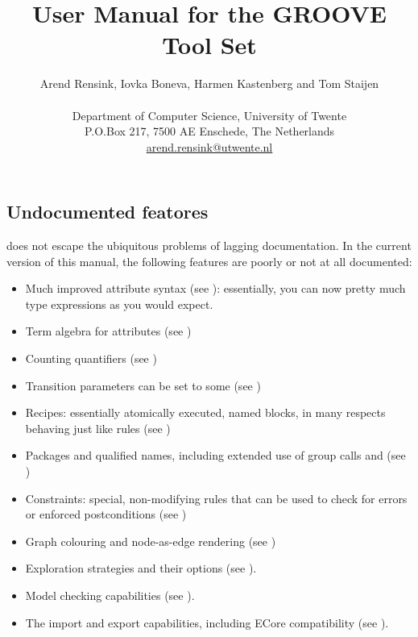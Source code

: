 \title{User Manual for the GROOVE Tool Set}
\author{Arend Rensink, Iovka Boneva, Harmen Kastenberg and Tom Staijen \\
%
\vspace{0.2in} \\
%
Department of Computer Science, University of Twente \\
P.O.Box 217, 7500 AE Enschede, The Netherlands \\
\url{arend.rensink@utwente.nl}
}
\maketitle
%
\vspace{0.2in}

\clearpage
\tableofcontents

\clearpage
\subsection{Undocumented featores}

\GROOVE does not escape the ubiquitous problems of lagging documentation. In
the current version of this manual, the following features are poorly or not
at all documented:
%
\begin{itemize}[noitemsep]
\item Much improved attribute syntax (see ): essentially, you can now pretty much type expressions as you would expect.
\item Term algebra for attributes (see )
\item Counting quantifiers (see )
\item Transition parameters can be set to \textsf{some} (see )
\item Recipes: essentially atomically executed, named blocks, in many respects behaving just like rules (see )
\item Packages and qualified names, including extended use of group calls \anyK and \otherK (see )
\item Constraints: special, non-modifying rules that can be used to check for errors or enforced postconditions (see )
\item Graph colouring and node-as-edge rendering (see )
\item Exploration strategies and their options (see ). 
\item Model checking capabilities (see ). 
\item The import and export capabilities, including ECore compatibility (see ).
\end{itemize}

